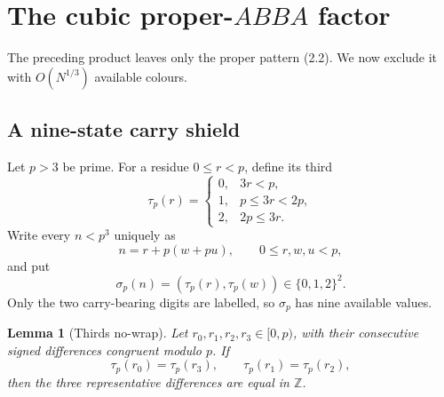 \documentclass[11pt]{article}
\newtheorem{lemma}[theorem]{Lemma}
\theoremstyle{definition}
\newcommand{\Z}{\mathbb Z}
\begin{document}
\section{The cubic proper-\(ABBA\) factor}

The preceding product leaves only the proper pattern (2.2).  We now exclude
it with \(O(N^{1/3})\) available colours.

\subsection{A nine-state carry shield}

Let \(p>3\) be prime.  For a residue \(0\leq r<p\), define its third
\[
 \tau_p(r)=
 \begin{cases}
 0,&3r<p,\\
 1,&p\leq3r<2p,\\
 2,&2p\leq3r.
 \end{cases}
 \tag{7.1}
\]
Write every \(n<p^3\) uniquely as
\[
 n=r+p(w+pu),\qquad0\leq r,w,u<p,
 \tag{7.2}
\]
and put
\[
 \sigma_p(n)=(\tau_p(r),\tau_p(w))\in\{0,1,2\}^2.
 \tag{7.3}
\]
Only the two carry-bearing digits are labelled, so \(\sigma_p\) has nine
available values.

\begin{lemma}[Thirds no-wrap]\label{lem:thirds}
Let \(r_0,r_1,r_2,r_3\in[0,p)\), with their consecutive signed differences
congruent modulo \(p\).  If
\[
 \tau_p(r_0)=\tau_p(r_3),\qquad
 \tau_p(r_1)=\tau_p(r_2),
 \tag{7.4}
\]
then the three representative differences are equal in \(\Z\).
\end{lemma}
\end{document}
